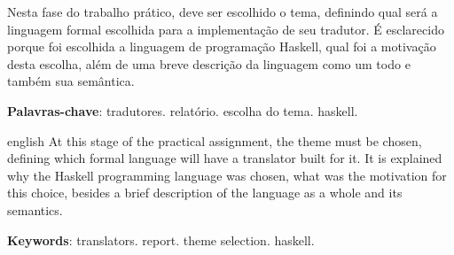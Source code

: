 \documentclass[
	article,			%
	11pt,				%
	oneside,			%
	a4paper,			%
	english,			%
	brazil,				%
	sumario=tradicional
	]{abntex2}
\begin{document}

\frenchspacing 


%
%

\maketitle





\begin{resumoumacoluna}
   Nesta fase do trabalho prático, deve ser escolhido o tema, definindo qual
   será a linguagem formal escolhida para a implementação de seu tradutor.
   É esclarecido porque foi escolhida a linguagem de programação Haskell, qual
   foi a motivação desta escolha, além de uma breve descrição da linguagem como
   um todo e também sua semântica.

 \vspace{\onelineskip}
 
 \noindent
 \textbf{Palavras-chave}: tradutores. relatório. escolha do tema. haskell.
\end{resumoumacoluna}


\renewcommand{\resumoname}{Abstract}
\begin{resumoumacoluna}
 \begin{otherlanguage*}{english}
   At this stage of the practical assignment, the theme must be chosen, defining
   which formal language will have a translator built for it. It is explained why
   the Haskell programming language was chosen, what was the motivation for this
   choice, besides a brief description of the language as a whole and its semantics.

   \vspace{\onelineskip}
 
   \noindent
   \textbf{Keywords}: translators. report. theme selection. haskell.
 \end{otherlanguage*}  
\end{resumoumacoluna}
\end{document}
